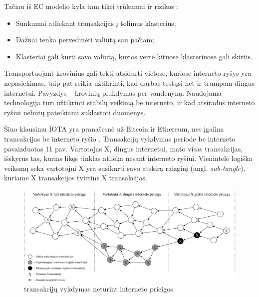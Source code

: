 Tačiau iš EC modelio kyla tam tikri trūkumai ir rizikos \cite{sergey2018economic}: 
\begin{itemize}
    \item Sunkumai atliekant transakcijas į tolimus klasterius;
    \item Dažnai tenka pervedinėti valiutą sau pačiam;
    \item Klasteriai gali kurti savo valiutą, kurios vertė kituose klasteriuose gali skirtis.
\end{itemize} 





Transportuojant krovinius gali tekti atsidurti vietose, kuriose interneto ryšys yra nepasiekimas, taip pat reikia užtikrinti, kad darbas tęstųsi net ir trumpam dingus internetui. Pavyzdys – krovinių plukdymas per vandenyną. Naudojama technologija turi užtikrinti stabilų veikimą be interneto, ir kad atsiradus interneto ryšiui nebūtų pateikiami suklastoti duomenys.

Šiuo klausimu IOTA yra pranašesnė už Bitcoin ir Ethereum, nes įgalina transakcijas be interneto ryšio \cite{zivic2019distributed}. Transakcijų vykdymas periode be interneto pavaizduotas 11 pav. Vartotojas X, dingus internetui, mato visas transakcijas, išskyrus tas, kurias likęs tinklas atlieka nesant interneto ryšiui. Vienintelė logiška veiksmų seka vartotojui X yra susikurti savo atskirą raizginį (angl. \textit{sub-tangle}), kuriame X transakcijos tvirtins X transakcijas.

\begin{figure}[H]
    \centering
    \includegraphics[scale=0.6]{images/offline-tangle}
    \caption{transakcijų vykdymas neturint interneto prieigos}
\end{figure}


